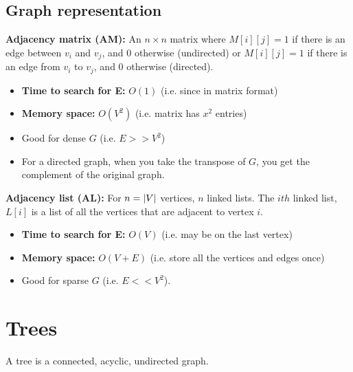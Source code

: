 \documentclass{article}
\begin{document}
\subsection{Graph representation}
\begin{definition}
    
    \textbf{Adjacency matrix (AM):} An $n\times n$ matrix where $M[i][j]=1$ if there is an edge between $v_i$ and $v_j$, and $0$ otherwise (undirected) or $M[i][j]=1$ if there is an edge from $v_i$ to $v_j$, and $0$ otherwise (directed).
    \begin{itemize}
        \item \textbf{Time to search for E:} $O(1)$ (i.e. since in matrix format)
        \item \textbf{Memory space:} $O(V^2)$ (i.e. matrix has $x^2$ entries)
        \item Good for dense $G$ (i.e. $E>>V^2$)
        \item For a directed graph, when you take the transpose of $G$, you get the complement of the original graph.
    \end{itemize}
    \vspace{1em}

    \textbf{Adjacency list (AL):} For $n=\abs{V}$ vertices, $n$ linked lists. The $ith$ linked list, $L[i]$ is a list of all the vertices that are adjacent to vertex $i$.
    \begin{itemize}
        \item \textbf{Time to search for E:} $O(V)$ (i.e. may be on the last vertex)
        \item \textbf{Memory space:} $O(V+E)$ (i.e. store all the vertices and edges once)
        \item Good for sparse $G$ (i.e. $E<<V^2$).
    \end{itemize}
    \vspace{1em}
\end{definition}
\newpage

\section{Trees}
\begin{definition}
    A tree is a connected, acyclic, undirected graph. 
\end{definition}
\end{document}
